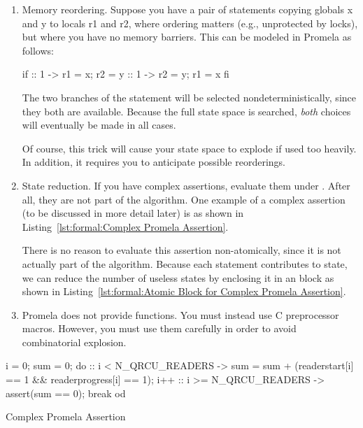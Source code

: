 \begin{enumerate}
\item	Memory reordering.  Suppose you have a pair of statements
	copying globals x and y to locals r1 and r2, where ordering
	matters (e.g., unprotected by locks), but where you have
	no memory barriers.  This can be modeled in Promela as follows:

\begin{VerbatimN}[samepage=true]
if
:: 1 -> r1 = x;
        r2 = y
:: 1 -> r2 = y;
        r1 = x
fi
\end{VerbatimN}

	The two branches of the  statement will be selected
	nondeterministically, since they both are available.
	Because the full state space is searched, \emph{both} choices
	will eventually be made in all cases.

	Of course, this trick will cause your state space to explode
	if used too heavily.
	In addition, it requires you to anticipate possible reorderings.

\item	State reduction.  If you have complex assertions, evaluate
	them under .  After all, they are not part of the
	algorithm.  One example of a complex assertion (to be discussed
	in more detail later) is as shown in
	Listing~\ref{lst:formal:Complex Promela Assertion}.

	There is no reason to evaluate this assertion
	non-atomically, since it is not actually part of the algorithm.
	Because each statement contributes to state, we can reduce
	the number of useless states by enclosing it in an 
	block as shown in
	Listing~\ref{lst:formal:Atomic Block for Complex Promela Assertion}.

\item	Promela does not provide functions.
	You must instead use C preprocessor macros.
	However, you must use them carefully in order to avoid
	combinatorial explosion.
\end{enumerate}

\begin{listing}[tbp]
\begin{VerbatimL}
i = 0;
sum = 0;
do
:: i < N_QRCU_READERS ->
	sum = sum + (readerstart[i] == 1 &&
	             readerprogress[i] == 1);
	i++
:: i >= N_QRCU_READERS ->
	assert(sum == 0);
	break
od
\end{VerbatimL}
\caption{Complex Promela Assertion}
\label{lst:formal:Complex Promela Assertion}
\end{listing}


